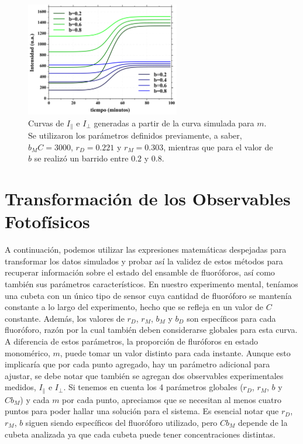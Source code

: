 \begin{figure}
\centering
    \includegraphics[width=0.6\textwidth]{./img/Ints_sim.png}
    \caption{Curvas de $I_{\parallel}$ e $I_{\perp}$ generadas a partir de la curva simulada para $m$. Se utilizaron los parámetros definidos previamente, a saber, $b_M C = 3000$, $r_D=0.221$ y $r_M=0.303$, mientras que para el valor de $b$ se realizó un barrido entre $0.2$ y $0.8$.}
    \label{fig:Ints_sim}
\end{figure}


\section{Transformación de los Observables Fotofísicos}

A continuación, podemos utilizar las expresiones matemáticas despejadas para transformar los datos simulados y probar así la validez de estos métodos para recuperar información sobre el estado del ensamble de fluoróforos, así como también sus parámetros característicos. En nuestro experimento mental, teníamos una cubeta con un único tipo de sensor cuya cantidad de fluoróforo se mantenía constante a lo largo del experimento, hecho que se refleja en un valor de $C$ constante. Además, los valores de $r_D$, $r_M$, $b_M$ y $b_D$ son específicos para cada fluoróforo, razón por la cual también deben considerarse globales para esta curva. A diferencia de estos parámetros, la proporción de fluróforos en estado monomérico, $m$, puede tomar un valor distinto para cada instante. Aunque esto implicaría que por cada punto agregado, hay un parámetro adicional para ajustar, se debe notar que también se agregan dos observables experimentales medidos, $I_{\parallel}$ e $I_{\perp}$. Si tenemos en cuenta los 4 parámetros globales ($r_D$, $r_M$, $b$ y $C b_M$) y cada $m$ por cada punto, apreciamos que se necesitan al menos cuatro puntos para poder hallar una solución para el sistema. Es esencial notar que $r_D$, $r_M$, $b$ siguen siendo específicos del fluoróforo utilizado, pero $C b_M$ depende de la cubeta analizada ya que cada cubeta puede tener concentraciones distintas.

